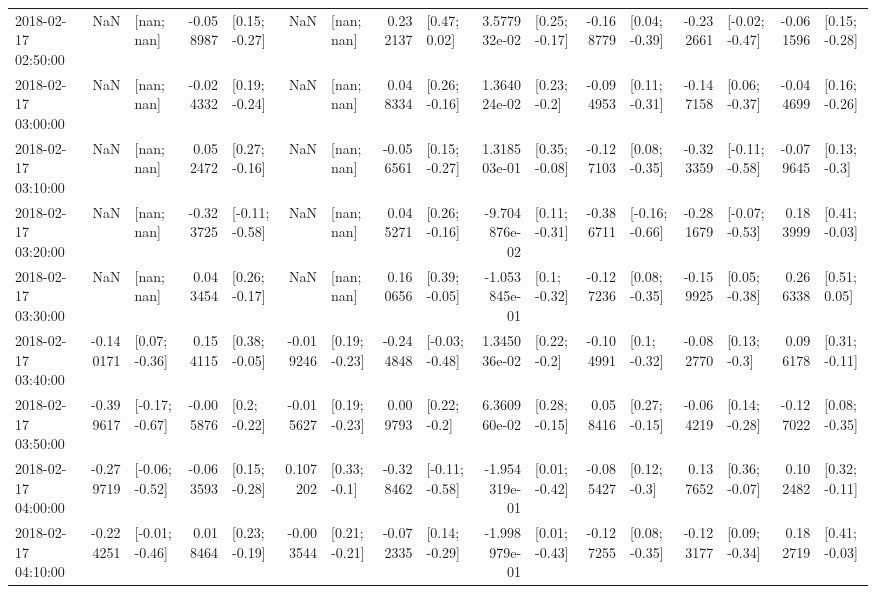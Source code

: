 \begin{tabular}{lrlrlrlrlrlrlrlrl}
2018-02-17 02:50:00 &       NaN &      [nan; nan] & -0.058987 &   [0.15; -0.27] &       NaN &      [nan; nan] &  0.232137 &    [0.47; 0.02] &  3.577932e-02 &   [0.25; -0.17] & -0.168779 &   [0.04; -0.39] & -0.232661 &  [-0.02; -0.47] & -0.061596 &   [0.15; -0.28] \\
2018-02-17 03:00:00 &       NaN &      [nan; nan] & -0.024332 &   [0.19; -0.24] &       NaN &      [nan; nan] &  0.048334 &   [0.26; -0.16] &  1.364024e-02 &    [0.23; -0.2] & -0.094953 &   [0.11; -0.31] & -0.147158 &   [0.06; -0.37] & -0.044699 &   [0.16; -0.26] \\
2018-02-17 03:10:00 &       NaN &      [nan; nan] &  0.052472 &   [0.27; -0.16] &       NaN &      [nan; nan] & -0.056561 &   [0.15; -0.27] &  1.318503e-01 &   [0.35; -0.08] & -0.127103 &   [0.08; -0.35] & -0.323359 &  [-0.11; -0.58] & -0.079645 &    [0.13; -0.3] \\
2018-02-17 03:20:00 &       NaN &      [nan; nan] & -0.323725 &  [-0.11; -0.58] &       NaN &      [nan; nan] &  0.045271 &   [0.26; -0.16] & -9.704876e-02 &   [0.11; -0.31] & -0.386711 &  [-0.16; -0.66] & -0.281679 &  [-0.07; -0.53] &  0.183999 &   [0.41; -0.03] \\
2018-02-17 03:30:00 &       NaN &      [nan; nan] &  0.043454 &   [0.26; -0.17] &       NaN &      [nan; nan] &  0.160656 &   [0.39; -0.05] & -1.053845e-01 &    [0.1; -0.32] & -0.127236 &   [0.08; -0.35] & -0.159925 &   [0.05; -0.38] &  0.266338 &    [0.51; 0.05] \\
2018-02-17 03:40:00 & -0.140171 &   [0.07; -0.36] &  0.154115 &   [0.38; -0.05] & -0.019246 &   [0.19; -0.23] & -0.244848 &  [-0.03; -0.48] &  1.345036e-02 &    [0.22; -0.2] & -0.104991 &    [0.1; -0.32] & -0.082770 &    [0.13; -0.3] &  0.096178 &   [0.31; -0.11] \\
2018-02-17 03:50:00 & -0.399617 &  [-0.17; -0.67] & -0.005876 &    [0.2; -0.22] & -0.015627 &   [0.19; -0.23] &  0.009793 &    [0.22; -0.2] &  6.360960e-02 &   [0.28; -0.15] &  0.058416 &   [0.27; -0.15] & -0.064219 &   [0.14; -0.28] & -0.127022 &   [0.08; -0.35] \\
2018-02-17 04:00:00 & -0.279719 &  [-0.06; -0.52] & -0.063593 &   [0.15; -0.28] &  0.107202 &    [0.33; -0.1] & -0.328462 &  [-0.11; -0.58] & -1.954319e-01 &   [0.01; -0.42] & -0.085427 &    [0.12; -0.3] &  0.137652 &   [0.36; -0.07] &  0.102482 &   [0.32; -0.11] \\
2018-02-17 04:10:00 & -0.224251 &  [-0.01; -0.46] &  0.018464 &   [0.23; -0.19] & -0.003544 &   [0.21; -0.21] & -0.072335 &   [0.14; -0.29] & -1.998979e-01 &   [0.01; -0.43] & -0.127255 &   [0.08; -0.35] & -0.123177 &   [0.09; -0.34] &  0.182719 &   [0.41; -0.03] \\

\end{tabular}
